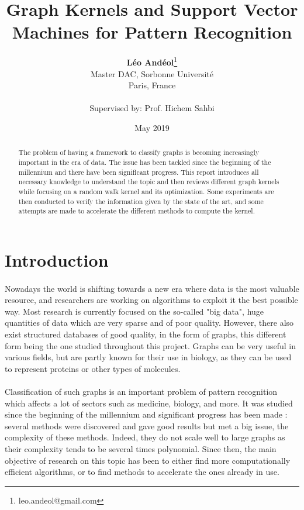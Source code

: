 \documentclass{article}
\title{Graph Kernels and Support Vector Machines for Pattern Recognition}
\author{\textbf{Léo Andéol}\thanks{leo.andeol@gmail.com}\\ Master DAC, Sorbonne Université\\ Paris, France\\\\ \footnotesize Supervised by: Prof. Hichem Sahbi}
\date{May 2019}
\theoremstyle{definition}
\begin{document}
\maketitle
\begin{abstract}
	The problem of having a framework to classify graphs is becoming increasingly important in the era of data. The issue has been tackled since the beginning of the millennium and there have been significant progress. This report introduces all necessary knowledge to understand the topic and then reviews different graph kernels while focusing on a random walk kernel and its optimization. Some experiments are then conducted to verify the information given by the state of the art, and some attempts are made to accelerate the different methods to compute the kernel.  
\end{abstract}

\newpage

\tableofcontents

\newpage

\section{Introduction}
 \paragraph{}Nowadays the world is shifting towards a new era where data is the most valuable resource, and researchers are working on algorithms to exploit it the best possible way. Most research is currently focused on the so-called "big data", huge quantities of data which are very sparse and of poor quality. However, there also exist structured databases of good quality, in the form of graphs, this different form being the one studied throughout this project. Graphs can be very useful in various fields, but are partly known for their use in biology, as they can be used to represent proteins or other types of molecules.
 \paragraph{}Classification of such graphs is an important problem of pattern recognition which affects a lot of sectors such as medicine, biology, and more. It was studied since the beginning of the millennium and significant progress has been made : several methods were discovered and gave good results but met a big issue, the complexity of these methods. Indeed, they do not scale well to large graphs as their complexity tends to be several times polynomial. Since then, the main objective of research on this topic has been to either find more computationally efficient algorithms, or to find methods to accelerate the ones already in use.
\end{document}
